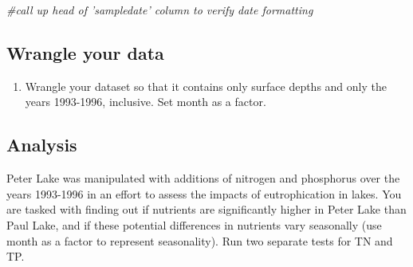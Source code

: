 \documentclass[
]{article}
\newenvironment{Shaded}{\begin{snugshade}}{\end{snugshade}}
\newcommand{\CommentTok}[1]{\textcolor[rgb]{0.56,0.35,0.01}{\textit{#1}}}
\newcommand{\DecValTok}[1]{\textcolor[rgb]{0.00,0.00,0.81}{#1}}
\newcommand{\FloatTok}[1]{\textcolor[rgb]{0.00,0.00,0.81}{#1}}
\newcommand{\KeywordTok}[1]{\textcolor[rgb]{0.13,0.29,0.53}{\textbf{#1}}}
\newcommand{\NormalTok}[1]{#1}
\newcommand{\OperatorTok}[1]{\textcolor[rgb]{0.81,0.36,0.00}{\textbf{#1}}}
\newcommand{\StringTok}[1]{\textcolor[rgb]{0.31,0.60,0.02}{#1}}
\providecommand{\tightlist}{%
  \setlength{\itemsep}{0pt}\setlength{\parskip}{0pt}}
\begin{document}
\begin{Shaded}
\begin{Highlighting}[]
\CommentTok{#call up head of 'sampledate' column to verify date formatting }
\end{Highlighting}
\end{Shaded}

\hypertarget{wrangle-your-data}{%
\subsection{Wrangle your data}\label{wrangle-your-data}}

\begin{enumerate}
\def\labelenumi{\arabic{enumi}.}
\setcounter{enumi}{2}
\tightlist
\item
  Wrangle your dataset so that it contains only surface depths and only
  the years 1993-1996, inclusive. Set month as a factor.
\end{enumerate}

\begin{Shaded}
\end{Shaded}

\hypertarget{analysis}{%
\subsection{Analysis}\label{analysis}}

Peter Lake was manipulated with additions of nitrogen and phosphorus
over the years 1993-1996 in an effort to assess the impacts of
eutrophication in lakes. You are tasked with finding out if nutrients
are significantly higher in Peter Lake than Paul Lake, and if these
potential differences in nutrients vary seasonally (use month as a
factor to represent seasonality). Run two separate tests for TN and TP.
\end{document}
